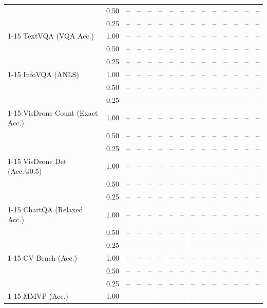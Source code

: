 \begin{table}[t]
{\begin{tabular}{l c | c c c c | c c c c | c c | c c c}
 & 0.50 & -- & -- & -- & -- & -- & -- & -- & -- & -- & -- & -- & -- & -- \\
 & 0.25 & -- & -- & -- & -- & -- & -- & -- & -- & -- & -- & -- & -- & -- \\
\cmidrule(lr){1-15}
TextVQA (VQA Acc.) & 1.00 & -- & -- & -- & -- & -- & -- & -- & -- & -- & -- & -- & -- & -- \\
 & 0.50 & -- & -- & -- & -- & -- & -- & -- & -- & -- & -- & -- & -- & -- \\
 & 0.25 & -- & -- & -- & -- & -- & -- & -- & -- & -- & -- & -- & -- & -- \\
\cmidrule(lr){1-15}
InfoVQA (ANLS) & 1.00 & -- & -- & -- & -- & -- & -- & -- & -- & -- & -- & -- & -- & -- \\
 & 0.50 & -- & -- & -- & -- & -- & -- & -- & -- & -- & -- & -- & -- & -- \\
 & 0.25 & -- & -- & -- & -- & -- & -- & -- & -- & -- & -- & -- & -- & -- \\
\cmidrule(lr){1-15}
VisDrone Count (Exact Acc.) & 1.00 & -- & -- & -- & -- & -- & -- & -- & -- & -- & -- & -- & -- & -- \\
 & 0.50 & -- & -- & -- & -- & -- & -- & -- & -- & -- & -- & -- & -- & -- \\
 & 0.25 & -- & -- & -- & -- & -- & -- & -- & -- & -- & -- & -- & -- & -- \\
\cmidrule(lr){1-15}
VisDrone Det (Acc.@0.5) & 1.00 & -- & -- & -- & -- & -- & -- & -- & -- & -- & -- & -- & -- & -- \\
 & 0.50 & -- & -- & -- & -- & -- & -- & -- & -- & -- & -- & -- & -- & -- \\
 & 0.25 & -- & -- & -- & -- & -- & -- & -- & -- & -- & -- & -- & -- & -- \\
\cmidrule(lr){1-15}
ChartQA (Relaxed Acc.) & 1.00 & -- & -- & -- & -- & -- & -- & -- & -- & -- & -- & -- & -- & -- \\
 & 0.50 & -- & -- & -- & -- & -- & -- & -- & -- & -- & -- & -- & -- & -- \\
 & 0.25 & -- & -- & -- & -- & -- & -- & -- & -- & -- & -- & -- & -- & -- \\
\cmidrule(lr){1-15}
CV-Bench (Acc.) & 1.00 & -- & -- & -- & -- & -- & -- & -- & -- & -- & -- & -- & -- & -- \\
 & 0.50 & -- & -- & -- & -- & -- & -- & -- & -- & -- & -- & -- & -- & -- \\
 & 0.25 & -- & -- & -- & -- & -- & -- & -- & -- & -- & -- & -- & -- & -- \\
\cmidrule(lr){1-15}
MMVP (Acc.) & 1.00 & -- & -- & -- & -- & -- & -- & -- & -- & -- & -- & -- & -- & -- \\

\end{tabular}}
\end{table}
